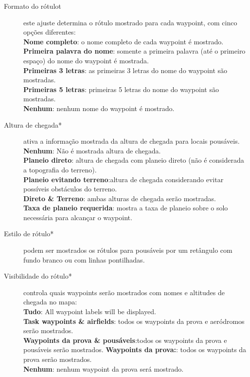 \begin{description}
\item[Formato do rótulot]  este ajuste  \label{conf:labels} determina o rótulo mostrado 
  para cada waypoint, com cinco opções diferentes: \\
  {\bf Nome completo}: o nome completo de cada waypoint é mostrado. \\
  {\bf Primeira palavra do nome}: somente a primeira palavra (até o primeiro espaço) 
  do nome do waypoint é mostrada.
 \\
  {\bf Primeiras 3 letras}: as primeiras 3 letras do nome do waypoint são mostradas. \\
  {\bf Primeiras 5 letras}: primeiras 5 letras do nome do waypoint são mostradas. \\
  {\bf Nenhum}: nenhum nome do waypoint é mostrado.
\item[Altura de chegada*] \label{conf:arrivalheight} ativa a informação mostrada da 
  altura de chegada para locais pousáveis. \\
  {\bf Nenhum}: Não é mostrada altura de chegada. \\
  {\bf Planeio direto}: altura de chegada com planeio direto (não é considerada a topografia do terreno). \\
  {\bf Planeio evitando terreno}:altura de chegada considerando evitar possíveis obstáculos do terreno.  \\
  {\bf Direto \& Terreno}: ambas alturas de chegada serão mostradas. \\
  {\bf Taxa de planeio requerida}: mostra a taxa de planeio sobre o solo necessária para alcançar o waypoint.
\item[Estilo de rótulo*]  podem ser mostrados os rótulos para pousáveis por um retângulo com fundo branco ou com linhas pontilhadas.
\item[Visibilidade do rótulo*]  \label{conf:labelvisibility} controla quais waypoints serão mostrados com nomes e altitudes de chegada no mapa: \\
  {\bf Tudo}: All waypoint labels will be displayed. \\
  {\bf Task waypoints \& airfields}: todos os waypoints da prova e aeródromos serão mostrados. \\
  {\bf Waypoints da prova \& pousáveis}:todos os waypoints da prova e pousáveis serão mostrados.
  {\bf Waypoints da prova:}: todos os waypoints da prova serão mostrados. \\
  {\bf Nenhum}:  nenhum waypoint da prova será mostrado.

\end{description}
